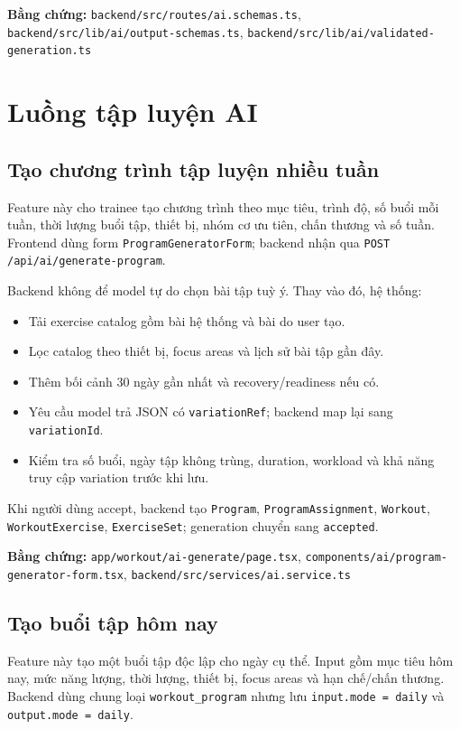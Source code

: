 \documentclass[12pt,a4paper]{article}
\newcommand{\code}[1]{\texttt{#1}}
\newcommand{\evidence}[1]{{\small\nolinkurl{#1}}}
\begin{document}
\textbf{Bằng chứng:} \evidence{backend/src/routes/ai.schemas.ts}, \evidence{backend/src/lib/ai/output-schemas.ts}, \evidence{backend/src/lib/ai/validated-generation.ts}

\section{Luồng tập luyện AI}

\subsection{Tạo chương trình tập luyện nhiều tuần}

Feature này cho trainee tạo chương trình theo mục tiêu, trình độ, số buổi mỗi tuần, thời lượng buổi tập, thiết bị, nhóm cơ ưu tiên, chấn thương và số tuần. Frontend dùng form \code{ProgramGeneratorForm}; backend nhận qua \code{POST /api/ai/generate-program}.

Backend không để model tự do chọn bài tập tuỳ ý. Thay vào đó, hệ thống:

\begin{itemize}
  \item Tải exercise catalog gồm bài hệ thống và bài do user tạo.
  \item Lọc catalog theo thiết bị, focus areas và lịch sử bài tập gần đây.
  \item Thêm bối cảnh 30 ngày gần nhất và recovery/readiness nếu có.
  \item Yêu cầu model trả JSON có \code{variationRef}; backend map lại sang \code{variationId}.
  \item Kiểm tra số buổi, ngày tập không trùng, duration, workload và khả năng truy cập variation trước khi lưu.
\end{itemize}

Khi người dùng accept, backend tạo \code{Program}, \code{ProgramAssignment}, \code{Workout}, \code{WorkoutExercise}, \code{ExerciseSet}; generation chuyển sang \code{accepted}.

\textbf{Bằng chứng:} \evidence{app/workout/ai-generate/page.tsx}, \evidence{components/ai/program-generator-form.tsx}, \evidence{backend/src/services/ai.service.ts}

\subsection{Tạo buổi tập hôm nay}

Feature này tạo một buổi tập độc lập cho ngày cụ thể. Input gồm mục tiêu hôm nay, mức năng lượng, thời lượng, thiết bị, focus areas và hạn chế/chấn thương. Backend dùng chung loại \code{workout\_program} nhưng lưu \code{input.mode = daily} và \code{output.mode = daily}.
\end{document}
